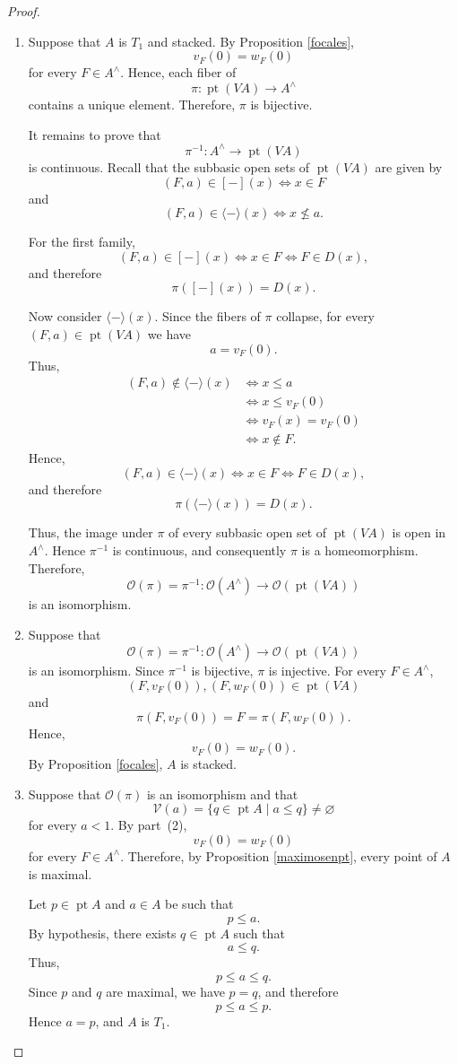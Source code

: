 \documentclass[11pt]{amsart}
\DeclareMathOperator{\pt}{pt}
\theoremstyle{plain}
\theoremstyle{definition}
\begin{document}
\begin{proof}
	\mbox{}
	\begin{enumerate}
		\item Suppose that $A$ is $T_1$ and stacked. By Proposition \ref{focales},
\[
v_F(0)=w_F(0)
\]
for every $F\in A^\wedge$. Hence, each fiber of
\[
\pi\colon\pt(VA)\longrightarrow A^\wedge
\]
contains a unique element. Therefore, $\pi$ is bijective.

It remains to prove that
\[
\pi^{-1}\colon A^\wedge\longrightarrow\pt(VA)
\]
is continuous. Recall that the subbasic open sets of $\pt(VA)$ are given by
\[
(F,a)\in[-](x)\Longleftrightarrow x\in F
\]
and
\[
(F,a)\in\langle-\rangle(x)\Longleftrightarrow x\nleq a.
\]

For the first family,
\[
(F,a)\in[-](x)
\Longleftrightarrow
x\in F
\Longleftrightarrow
F\in D(x),
\]
and therefore
\[
\pi([-](x))=D(x).
\]

Now consider $\langle-\rangle(x)$. Since the fibers of $\pi$ collapse, for every
$(F,a)\in\pt(VA)$ we have
\[
a=v_F(0).
\]
Thus,
\[
\begin{aligned}
(F,a)\notin\langle-\rangle(x)
&\Longleftrightarrow x\leq a\\
&\Longleftrightarrow x\leq v_F(0)\\
&\Longleftrightarrow v_F(x)=v_F(0)\\
&\Longleftrightarrow x\notin F.
\end{aligned}
\]
Hence,
\[
(F,a)\in\langle-\rangle(x)
\Longleftrightarrow
x\in F
\Longleftrightarrow
F\in D(x),
\]
and therefore
\[
\pi(\langle-\rangle(x))=D(x).
\]

Thus, the image under $\pi$ of every subbasic open set of $\pt(VA)$ is open in
$A^\wedge$. Hence $\pi^{-1}$ is continuous, and consequently $\pi$ is a
homeomorphism. Therefore,
\[
\mathcal{O}(\pi)=\pi^{-1}\colon
\mathcal{O}(A^\wedge)\longrightarrow\mathcal{O}(\pt(VA))
\]
is an isomorphism.

\item Suppose that
\[
\mathcal{O}(\pi)=\pi^{-1}\colon
\mathcal{O}(A^\wedge)\longrightarrow\mathcal{O}(\pt(VA))
\]
is an isomorphism. Since $\pi^{-1}$ is bijective, $\pi$ is injective. For every
$F\in A^\wedge$,
\[
(F,v_F(0)),(F,w_F(0))\in\pt(VA)
\]
and
\[
\pi(F,v_F(0))=F=\pi(F,w_F(0)).
\]
Hence,
\[
v_F(0)=w_F(0).
\]
By Proposition \ref{focales}, $A$ is stacked.

\item Suppose that $\mathcal{O}(\pi)$ is an isomorphism and that
\[
\mathcal{V}(a)=\{q\in\pt A\mid a\leq q\}\neq\varnothing
\]
for every $a<1$. By part~(2),
\[
v_F(0)=w_F(0)
\]
for every $F\in A^\wedge$. Therefore, by Proposition \ref{maximosenpt}, every point of $A$ is
maximal.

Let $p\in\pt A$ and $a\in A$ be such that
\[
p\leq a.
\]
By hypothesis, there exists $q\in\pt A$ such that
\[
a\leq q.
\]
Thus,
\[
p\leq a\leq q.
\]
Since $p$ and $q$ are maximal, we have $p=q$, and therefore
\[
p\leq a\leq p.
\]
Hence $a=p$, and $A$ is $T_1$.
\end{enumerate}
\end{proof}
\end{document}

